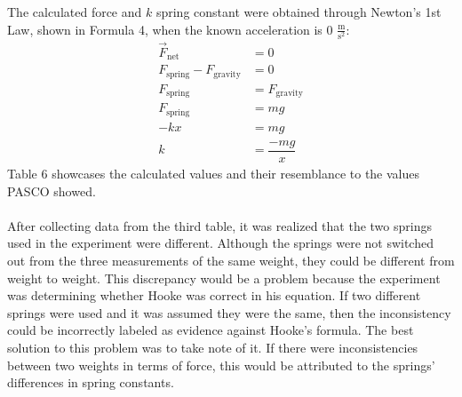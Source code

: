 \documentclass [12pt, letterpaper, twoside] {article}
\begin{document}
\noindent
The calculated force and \(k\) spring constant were obtained through Newton's 1st Law, shown in Formula 4, when the known acceleration is 0 \(\tfrac{\text{m}}{\text{s}^2}\):
\begin {equation}
  \begin {split}
    \vec{F}_{\text{net}} & = 0 \\
    F_{\text{spring}}-F_{\text{gravity}} & = 0 \\
    F_{\text{spring}} & = F_{\text{gravity}} \\
    F_{\text{spring}} & = mg \\
    -kx & = mg \\
    k & = \dfrac{-mg}{x}
  \end {split}
\end {equation}
Table 6 showcases the calculated values and their resemblance to the values PASCO showed. \\\\
After collecting data from the third table, it was realized that the two springs used in the experiment were different. Although the springs were not switched out from the three measurements of the same weight, they could be different from weight to weight. This discrepancy would be a problem because the experiment was determining whether Hooke was correct in his equation. If two different springs were used and it was assumed they were the same, then the inconsistency could be incorrectly labeled as evidence against Hooke's formula. 
The best solution to this problem was to take note of it. If there were inconsistencies between two weights in terms of force, this would be attributed to the springs' differences in spring constants. 
\end{document}
